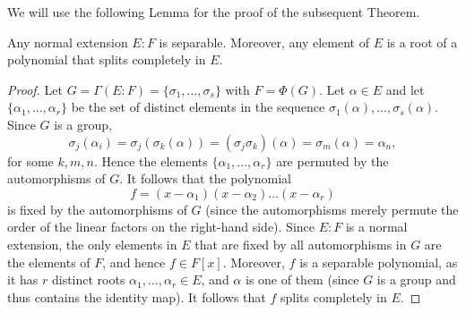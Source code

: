 We will use the following Lemma for the proof of the subsequent Theorem.
\begin{lemma}\label{lem:normal-extensions-separable}
	Any normal extension $E : F$ is separable. Moreover, any element of $E$ is a root of a polynomial that splits completely in $E$.
	\begin{proof}
		Let $G = \Gamma(E : F) = \{\sigma_1, \dots, \sigma_s\}$ with $F = \Phi(G)$. Let $\alpha \in E$ and let $\{\alpha_1, \dots, \alpha_r\}$ be the set of distinct elements in the sequence $\sigma_1(\alpha), \dots, \sigma_s(\alpha)$. Since $G$ is a group,
		\[
			\sigma_j(\alpha_i) = \sigma_j(\sigma_k(\alpha)) = (\sigma_j \sigma_k)(\alpha) = \sigma_m(\alpha) = \alpha_n,
		\]
		for some $k, m, n$. Hence the elements $\{\alpha_1, \dots, \alpha_r\}$ are permuted by the automorphisms of $G$. It follows that the polynomial
		\[
			f = (x - \alpha_1)(x - \alpha_2)\dots(x - \alpha_r)
		\]
		is fixed by the automorphisms of $G$ (since the automorphisms merely permute the order of the linear factors on the right-hand side). Since $E : F$ is a normal extension, the only elements in $E$ that are fixed by all automorphisms in $G$ are the elements of $F$, and hence $f \in F[x]$. Moreover, $f$ is a separable polynomial, as it has $r$ distinct roots $\alpha_1, \dots, \alpha_r \in E$, and $\alpha$ is one of them (since $G$ is a group and thus contains the identity map). It follows that $f$ splits completely in $E$.
	\end{proof}
\end{lemma}

